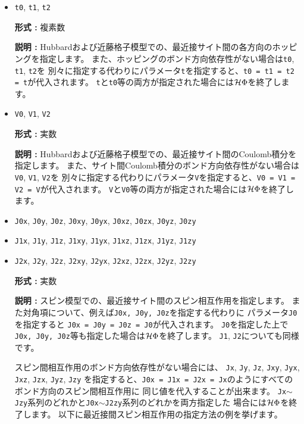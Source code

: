 \begin{itemize}
\item \verb|t0|,  \verb|t1|, \verb|t2|

{\bf 形式 :} 複素数

{\bf 説明 :} Hubbardおよび近藤格子模型での、最近接サイト間の各方向のホッピングを指定します。
また、ホッピングのボンド方向依存性がない場合は\verb|t0|,  \verb|t1|, \verb|t2|を
別々に指定する代わりにパラメータ\verb|t|を指定すると、\verb|t0 = t1 = t2 = t|が代入されます。
\verb|t|と\verb|t0|等の両方が指定された場合には$\mathcal{H} \Phi$を終了します。

\item \verb|V0|,  \verb|V1|, \verb|V2|

{\bf 形式 :} 実数

{\bf 説明 :} Hubbardおよび近藤格子模型での、最近接サイト間のCoulomb積分を指定します。
また、サイト間Coulomb積分のボンド方向依存性がない場合は\verb|V0|,  \verb|V1|, \verb|V2|を
別々に指定する代わりにパラメータ\verb|V|を指定すると、\verb|V0 = V1 = V2 = V|が代入されます。
\verb|V|と\verb|V0|等の両方が指定された場合には$\mathcal{H} \Phi$を終了します。

\item \verb|J0x|, \verb|J0y|, \verb|J0z|, \verb|J0xy|, 
  \verb|J0yx|, \verb|J0xz|, \verb|J0zx|, \verb|J0yz|, \verb|J0zy|
\item \verb|J1x|, \verb|J1y|, \verb|J1z|, \verb|J1xy|, 
  \verb|J1yx|, \verb|J1xz|, \verb|J1zx|, \verb|J1yz|, \verb|J1zy|
\item \verb|J2x|, \verb|J2y|, \verb|J2z|, \verb|J2xy|, 
  \verb|J2yx|, \verb|J2xz|, \verb|J2zx|, \verb|J2yz|, \verb|J2zy|

{\bf 形式 :} 実数

{\bf 説明 :} スピン模型での、最近接サイト間のスピン相互作用を指定します。
また対角項について、例えば\verb|J0x, J0y, J0z|を指定する代わりに
パラメータ\verb|J0|を指定すると
\verb|J0x = J0y = J0z = J0|が代入されます。
\verb|J0|を指定した上で\verb|J0x, J0y, J0z|等も指定した場合は$\mathcal{H} \Phi$を終了します。
\verb|J1|, \verb|J2|についても同様です。

スピン間相互作用のボンド方向依存性がない場合には、
\verb|Jx|, \verb|Jy|, \verb|Jz|, \verb|Jxy|, 
\verb|Jyx|, \verb|Jxz|, \verb|Jzx|, \verb|Jyz|, \verb|Jzy|
を指定すると、\verb|J0x = J1x = J2x = Jx|のようにすべてのボンド方向のスピン間相互作用に
同じ値を代入することが出来ます。
\verb|Jx|$\sim$\verb|Jzy|系列のどれかと\verb|J0x|$\sim$\verb|J2zy|系列のどれかを両方指定した
場合には$\mathcal{H} \Phi$を終了します。
以下に最近接間スピン相互作用の指定方法の例を挙げます。


\end{itemize}
